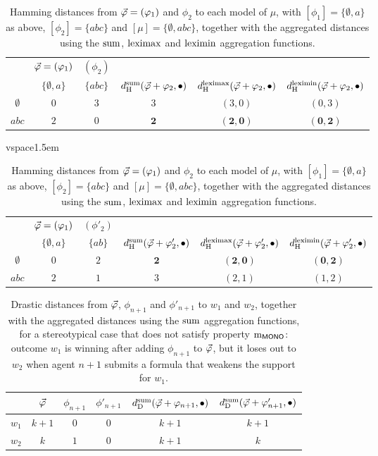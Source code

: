 \begin{table}\centering
	\begin{tabular}{cccccc}
		\toprule
		 & $\P=(\phi_1)$ & $(\phi_2)$ &&&\\
		 & $\{\emptyset,a\}$ & $\{abc\}$ & $\dd_{\hamming}^{\ssum}(\P+\phi_2,\bullet)$ & $\dd_{\hamming}^{\leximax}(\P+\phi_2,\bullet)$ & $\dd_{\hamming}^{\leximin}(\P+\phi_2,\bullet)$\\\midrule
		$\emptyset$ & $0$ & $3$ & $3$ & $(3,0)$ & $(0,3)$\\
		$abc$       & $2$ & $0$ & $\mathbf{2}$ & $\mathbf{(2,0)}$ & $\mathbf{(0,2)}$\\
		\bottomrule
	\end{tabular}
	\caption{
		Hamming distances from $\P=(\phi_1)$ and $\phi_2$ to each model of $\mu$,
		with $[\phi_{1}]=\{\emptyset,a\}$, $[\phi_2]=\{abc\}$ and $[\mu]=\{\emptyset,abc\}$,
		together with the aggregated distances using the $\ssum$, $\leximax$ and $\leximin$
		aggregation functions.
	}
	\label{tab:5-mono-1}
	vspace{1.5em}

	\begin{tabular}{cccccc}
		\toprule
		 & $\P=(\phi_1)$ & $(\phi'_2)$ &&&\\
		 & $\{\emptyset,a\}$ & $\{ab\}$ & $\dd_{\hamming}^{\ssum}(\P+\phi'_2,\bullet)$ & $\dd_{\hamming}^{\leximax}(\P+\phi'_2,\bullet)$ & $\dd_{\hamming}^{\leximin}(\P+\phi'_2,\bullet)$\\\midrule
		$\emptyset$ & $0$ & $2$ & $\mathbf{2}$ & $\mathbf{(2,0)}$ & $\mathbf{(0,2)}$\\
		$abc$       & $2$ & $1$ & $3$ & $(2,1)$ & $(1,2)$\\
		\bottomrule
	\end{tabular}
	\caption{
		Hamming distances from $\P=(\phi_1)$ and $\phi_2$ to each model of $\mu$,
		with $[\phi_{1}]=\{\emptyset,a\}$ as above, 
		$[\phi_2]=\{abc\}$ and $[\mu]=\{\emptyset,abc\}$,
		together with the aggregated distances using the $\ssum$, $\leximax$ and $\leximin$
		aggregation functions.
	}
	\label{tab:5-mono-2}
\end{table}

\begin{table}\centering
	\begin{tabular}{cccccc}
		\toprule
														 & 
		$\P$ 											 &  
		$\phi_{n+1}$ 									 & 
		$\phi'_{n+1}$ 									 & 
		$\dd_{\drastic}^{\ssum}(\P+\phi_{n+1},\bullet)$  & 
		$\dd_{\drastic}^{\ssum}(\P+\phi'_{n+1},\bullet)$ \\
				 										 \midrule
		$w_1$   & $k+1$ & $0$ & $0$ & $k+1$ & $k+1$\\
		$w_2$   & $k$   & $1$ & $0$ & $k+1$ & $k$\\
		\bottomrule
	\end{tabular}
	\caption{
		Drastic distances from $\P$, $\phi_{n+1}$ and $\phi'_{n+1}$ to $w_1$ and $w_2$,
		together with the aggregated distances using the $\ssum$ aggregation functions,
		for a stereotypical case that does not satisfy property $\oom{\MONO}$:
		outcome $w_1$ is winning after adding $\phi_{n+1}$ to $\P$,
		but it loses out to $w_2$ when agent $n+1$ submits a formula 
		that weakens the support for $w_1$.
	}
	\label{tab:5-mono-3}
\end{table}

